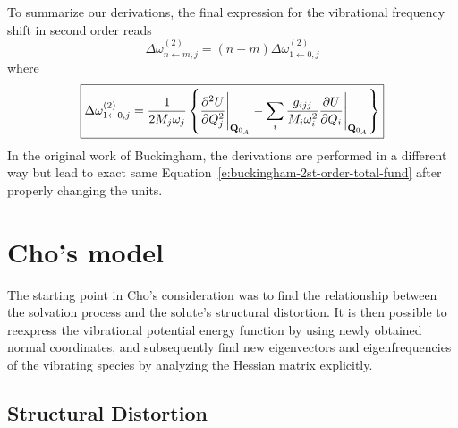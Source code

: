 \documentclass[a4paper,titlepage,twoside,fleqn,12pt]{book}
\begin{document}
\begin{refsection}
To summarize our derivations, the final expression for the vibrational frequency shift in 
second order reads
%
\begin{equation}
\label{e:buckingham-2st-order-total}
\boxed{
\Delta \omega_{n\leftarrow m,j}^{(2)} = \left( n-m \right) \Delta \omega_{1\leftarrow 0,j}^{(2)}
}
\end{equation}
%
where
%
\begin{equation}
\label{e:buckingham-2st-order-total-fund}
\boxed{
\Delta \omega_{1\leftarrow 0,j}^{(2)} = 
\frac{1}{2M_j\omega_j} 
\left\{
\frac{\partial^2 U}{\partial Q_j^2} \Bigg|_{{\bf Q}_{0_A}} 
%
- \sum_{i} \frac{g_{ijj}}{M_i\omega_i^2} 
\frac{\partial U}{\partial Q_i} \Bigg|_{{\bf Q}_{0_A}}
\right\}
}
\end{equation}
%
In the original work of Buckingham, the derivations are performed in a different way
but lead to exact same Equation~\eqref{e:buckingham-2st-order-total-fund} 
after properly changing the units.


\section{Cho's model}

The starting point in Cho's consideration was to find the relationship
between the solvation process and the solute's structural distortion.
It is then possible to reexpress the vibrational potential energy function
by using newly obtained normal coordinates, and subsequently find new eigenvectors and eigenfrequencies
of the vibrating species by analyzing the Hessian matrix explicitly.

\subsection{Structural Distortion}


\printbibliography[heading=subbibintoc,title={References}]
\end{refsection}
\end{document}
